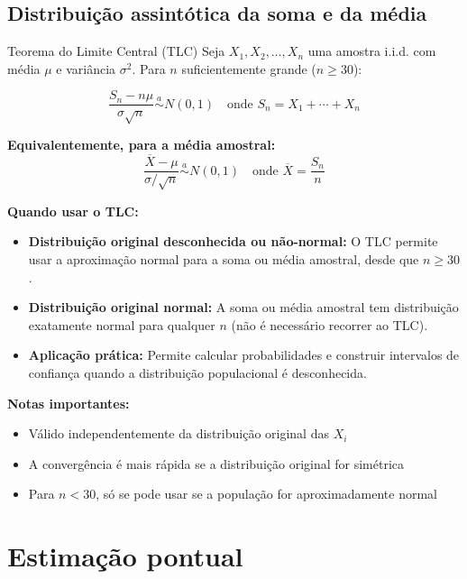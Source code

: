 \documentclass[a4paper,12pt]{article}
\begin{document}
\subsection{Distribuição assintótica da soma e da média}

\begin{formulabox}{Teorema do Limite Central (TLC)}
Seja $X_1, X_2, \ldots, X_n$ uma amostra i.i.d. com média $\mu$ e variância $\sigma^2$. Para $n$ suficientemente grande ($n \geq 30$):

\begin{equation}\label{formula22}\tag{Fórmula 22}
    \frac{S_n - n\mu}{\sigma\sqrt{n}} \overset{a}{\sim} N(0,1) \quad \text{onde } S_n = X_1 + \cdots + X_n
\end{equation}

\textbf{Equivalentemente, para a média amostral:}
\begin{equation}\label{formula22a}\tag{Fórmula 22a}
    \frac{\overline{X} - \mu}{\sigma/\sqrt{n}} \overset{a}{\sim} N(0,1) \quad \text{onde } \overline{X} = \frac{S_n}{n}
\end{equation}

\textbf{Quando usar o TLC:}
\begin{itemize}
    \item \textbf{Distribuição original desconhecida ou não-normal:} O TLC permite usar a aproximação normal para a soma ou média amostral, desde que $n \geq 30$.
    \item \textbf{Distribuição original normal:} A soma ou média amostral tem distribuição exatamente normal para qualquer $n$ (não é necessário recorrer ao TLC).
    \item \textbf{Aplicação prática:} Permite calcular probabilidades e construir intervalos de confiança quando a distribuição populacional é desconhecida.
\end{itemize}

\textbf{Notas importantes:}
\begin{itemize}
    \item Válido independentemente da distribuição original das $X_i$
    \item A convergência é mais rápida se a distribuição original for simétrica
    \item Para $n < 30$, só se pode usar se a população for aproximadamente normal
\end{itemize}
\end{formulabox}

\newpage

\section{\color{sectioncolor}Estimação pontual}
\end{document}
